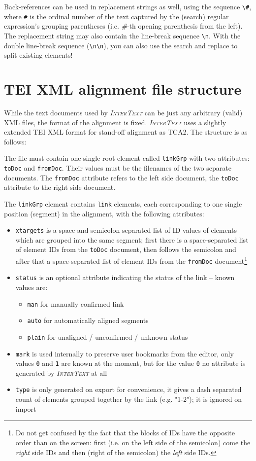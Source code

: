\documentclass[a4paper,10pt,oneside]{book}
\newcommand{\IT}{\textit{\textsc{InterText}}\xspace}
\begin{document}
Back-references can be used in replacement strings as well, using the sequence \texttt{\textbackslash \#}, where \texttt{\#} is the ordinal number of the text captured by the (search) regular expression's grouping parentheses (i.e. \emph{\#}-th opening parenthesis from the left). The replacement string may also contain the line-break sequence \texttt{\textbackslash n}. With the double line-break sequence (\texttt{\textbackslash n\textbackslash n}), you can also use the search  and replace to split existing elements!

\chapter{TEI XML alignment file structure}\label{ch:technical:TEIalignment}

While the text documents used by \IT can be just any arbitrary (valid) XML files, the format of the alignment is fixed. \IT uses a slightly extended TEI XML format for stand-off alignment as TCA2. The structure is as follows:

The file must contain one single root element called \texttt{linkGrp} with two attributes: \texttt{toDoc} and \texttt{fromDoc}. Their values must be the filenames of the two separate documents. The \texttt{fromDoc} attribute refers to the left side document, the \texttt{toDoc} attribute to the right side document.

The \texttt{linkGrp} element contains \texttt{link} elements, each corresponding to one single position (segment) in the alignment, with the following attributes:
\begin{itemize}
 \item \texttt{xtargets} is a space and semicolon separated list of ID-values of elements which are grouped into the same segment; first there is a space-separated list of element IDs from the \texttt{toDoc} document, then follows the semicolon and after that a space-separated list of element IDs from the \texttt{fromDoc} document\footnote{Do not get confused by the fact that the blocks of IDs have the opposite order than on the screen: first (i.e. on the left side of the semicolon) come the \emph{right} side IDs and then (right of the semicolon) the \emph{left} side IDs.} 
 \item \texttt{status} is an optional attribute indicating the status of the link -- known values are:
 \begin{itemize}
  \item \texttt{man} for manually confirmed link
  \item \texttt{auto} for automatically aligned segments
  \item \texttt{plain} for unaligned / unconfirmed / unknown status
 \end{itemize}
 \item \texttt{mark} is used internally to preserve user bookmarks from the editor, only values \texttt{0} and \texttt{1} are known at the moment, but for the value \texttt{0} no attribute is generated by \IT at all
 \item \texttt{type} is only generated on export for convenience, it gives a dash separated count of elements grouped together by the link (e.g. "1-2"); it is ignored on import
\end{itemize}
\end{document}
